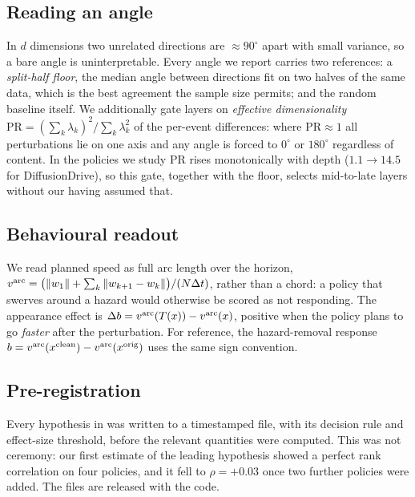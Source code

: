 \subsection{Reading an angle}
\label{sec:angles}

In $d$ dimensions two unrelated directions are $\approx 90^\circ$ apart with small variance, so
a bare angle is uninterpretable. Every angle we report carries two references: a
\emph{split-half floor}, the median angle between directions fit on two halves of the same
data, which is the best agreement the sample size permits; and the random baseline itself. We
additionally gate layers on \emph{effective dimensionality}
$\mathrm{PR} = (\sum_k\lambda_k)^2/\sum_k\lambda_k^2$ of the per-event differences: where
$\mathrm{PR}\approx 1$ all perturbations lie on one axis and any angle is forced to $0^\circ$ or
$180^\circ$ regardless of content. In the policies we study $\mathrm{PR}$ rises monotonically
with depth ($1.1 \to 14.5$ for DiffusionDrive), so this gate, together with the floor, selects
mid-to-late layers without our having assumed that.

\subsection{Behavioural readout}
\label{sec:readout}

We read planned speed as full arc length over the horizon,
$v^{\mathrm{arc}} = \big(\|w_1\| + \sum_k\|w_{k+1}-w_k\|\big)/(N\Delta t)$, rather than a chord: a
policy that swerves around a hazard would otherwise be scored as not responding. The
appearance effect is $\Delta b = v^{\mathrm{arc}}(T(x)) - v^{\mathrm{arc}}(x)$, positive when the policy plans
to go \emph{faster} after the perturbation. For reference, the hazard-removal response
$b = v^{\mathrm{arc}}(x^{\mathrm{clean}}) - v^{\mathrm{arc}}(x^{\mathrm{orig}})$ uses the same sign convention.

\subsection{Pre-registration}
\label{sec:prereg}

Every hypothesis in  was written to a timestamped file, with its decision
rule and effect-size threshold, before the relevant quantities were computed. This was not
ceremony: our first estimate of the leading hypothesis showed a perfect rank correlation on
four policies, and it fell to $\rho = +0.03$ once two further policies were added. The files
are released with the code.
